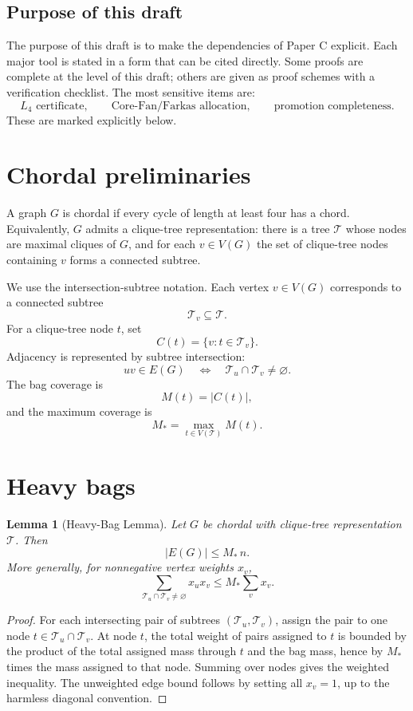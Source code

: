 \documentclass[11pt]{article}
\newtheorem{lemma}[theorem]{Lemma}
\theoremstyle{definition}
\newcommand{\calT}{\mathcal T}
\begin{document}
\subsection*{Purpose of this draft}

The purpose of this draft is to make the dependencies of Paper C explicit. Each major tool is stated in a form that can be cited directly. Some proofs are complete at the level of this draft; others are given as proof schemes with a verification checklist. The most sensitive items are:
\[
    L_4\text{ certificate},\qquad
    \text{Core-Fan/Farkas allocation},\qquad
    \text{promotion completeness}.
\]
These are marked explicitly below.

\section{Chordal preliminaries}

A graph \(G\) is chordal if every cycle of length at least four has a chord. Equivalently, \(G\) admits a clique-tree representation: there is a tree \(\calT\) whose nodes are maximal cliques of \(G\), and for each \(v\in V(G)\) the set of clique-tree nodes containing \(v\) forms a connected subtree.

We use the intersection-subtree notation. Each vertex \(v\in V(G)\) corresponds to a connected subtree
\[
    \calT_v\subseteq \calT.
\]
For a clique-tree node \(t\), set
\[
    C(t)=\{v:t\in\calT_v\}.
\]
Adjacency is represented by subtree intersection:
\[
    uv\in E(G)
    \quad\Longleftrightarrow\quad
    \calT_u\cap\calT_v\neq\varnothing.
\]
The bag coverage is
\[
    M(t)=|C(t)|,
\]
and the maximum coverage is
\[
    M_*=\max_{t\in V(\calT)}M(t).
\]

\section{Heavy bags}

\begin{lemma}[Heavy-Bag Lemma]\label{lem:heavy-bag}
Let \(G\) be chordal with clique-tree representation \(\calT\). Then
\[
    |E(G)|\le M_*\,n.
\]
More generally, for nonnegative vertex weights \(x_v\),
\[
    \sum_{\calT_u\cap\calT_v\neq\varnothing}x_ux_v
    \le
    M_*\sum_vx_v.
\]
\end{lemma}

\begin{proof}
For each intersecting pair of subtrees \((\calT_u,\calT_v)\), assign the pair to one node \(t\in\calT_u\cap\calT_v\). At node \(t\), the total weight of pairs assigned to \(t\) is bounded by the product of the total assigned mass through \(t\) and the bag mass, hence by \(M_*\) times the mass assigned to that node. Summing over nodes gives the weighted inequality. The unweighted edge bound follows by setting all \(x_v=1\), up to the harmless diagonal convention.
\end{proof}
\end{document}
